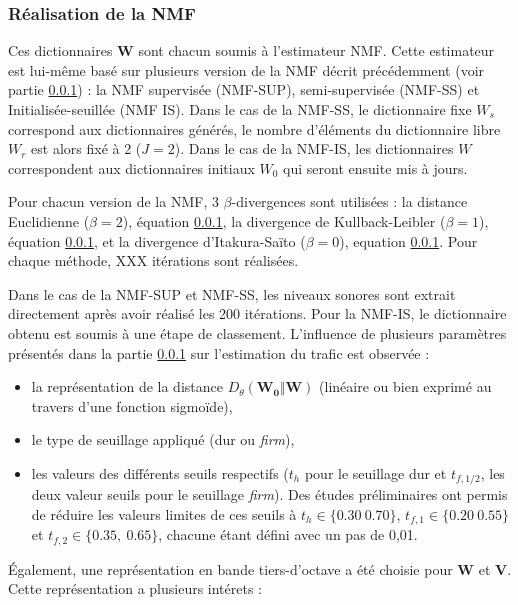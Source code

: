 \subsubsection{Réalisation de la NMF}

Ces dictionnaires $\mathbf{W}$ sont chacun soumis à l'estimateur NMF. Cette estimateur est lui-même basé sur plusieurs version de la NMF décrit précédemment (voir partie \ref{}) : la NMF supervisée (NMF-SUP), semi-supervisée (NMF-SS) et Initialisée-seuillée (NMF IS). Dans le cas de la NMF-SS, le dictionnaire fixe $W_s$ correspond aux dictionnaires générés, le nombre d'éléments du dictionnaire libre $W_r$ est alors fixé à 2 ($J = 2$). Dans le cas de la NMF-IS, les dictionnaires $W$ correspondent aux dictionnaires initiaux $W_0$ qui seront ensuite mis à jours.

Pour chacun version de la NMF, 3 $\beta$-divergences sont utilisées : la distance Euclidienne ($\beta = 2$), équation \ref{}, la divergence de Kullback-Leibler ($\beta = 1$), équation \ref{}, et la divergence d'Itakura-Saïto ($\beta = 0$), equation \ref{}. Pour chaque méthode, XXX itérations sont réalisées. 

Dans le cas de la NMF-SUP et NMF-SS, les niveaux sonores sont extrait directement après avoir réalisé les 200 itérations. Pour la NMF-IS, le dictionnaire obtenu est soumis à une étape de classement. L'influence de plusieurs paramètres présentés dans la partie \ref{} sur l'estimation du trafic est observée : 

\begin{itemize}
\item la représentation de la distance $D_{\theta}(\mathbf{W_0}\Vert \mathbf{W})$ (linéaire ou bien exprimé au travers d'une fonction sigmoïde),
\item le type de seuillage appliqué (dur ou \textit{firm}),
\item les valeurs des différents seuils respectifs ($t_h$ pour le seuillage dur et $t_{f,1/2}$, les deux valeur seuils pour le seuillage \textit{firm}). Des études préliminaires ont permis de réduire les valeurs limites de ces seuils à $t_h \in \lbrace 0.30~0.70 \rbrace$, $t_{f,1} \in \lbrace 0.20~0.55 \rbrace$ et $t_{f,2} \in \lbrace 0.35,~0.65 \rbrace$, chacune étant défini avec un pas de 0,01.
\end{itemize}


\'Egalement, une représentation en bande tiers-d'octave a été choisie pour $\mathbf{W}$ et $\mathbf{V}$. Cette représentation a plusieurs intérets : 

